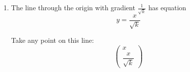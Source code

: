 \documentclass[leqno]{article}
\begin{document}
\begin{enumerate}[
  label=\textbf{\arabic*.},
  leftmargin=*,
  topsep=0pt,
  partopsep=0pt,
  parsep=0pt
]
\begin{djsSolution}
\begin{enumerate}[label=\textbf{(\alph*)}]
  The area scale factor of a transformation is $|\det(\mathbf{M})|$, so
  \[
  \det(\mathbf{M})
  =
  \begin{vmatrix}
  0 & k\\
  1 & 0
  \end{vmatrix}
  =0-k=-k
  \]

  Hence the area scale factor is
  \[
  |\det(\mathbf{M})|=k
  \]

  Since the unit square has area $1$, the area of rectangle $OABC$ is
  \[
  1\times k=k
  \]

  To transform $OABC$ back to the unit square, we need $\mathbf{M}^{-1}$.
  For
  \[
  \mathbf{M}=
  \begin{pmatrix}
  0 & k\\
  1 & 0
  \end{pmatrix}
  \]
  \[
  \mathbf{M}^{-1}
  =
  -\frac{1}{k}
  \begin{pmatrix}
  0 & -k\\
  -1 & 0
  \end{pmatrix}
  =
  \begin{pmatrix}
  0 & 1\\
  \frac{1}{k} & 0
  \end{pmatrix}
  \]

  Therefore the area of $OABC$ is $k$, and the required matrix is
  \[
  \begin{pmatrix}
  0 & 1\\
  \frac{1}{k} & 0
  \end{pmatrix}
  \]

  \item The line through the origin with gradient $\frac{1}{\sqrt{k}}$ has equation
  \[
  y=\frac{x}{\sqrt{k}}
  \]

  Take any point on this line:
  \[
  \begin{pmatrix}
  x\\[2pt]
  \dfrac{x}{\sqrt{k}}
  \end{pmatrix}
  \]


\end{enumerate}
\end{djsSolution}
\end{enumerate}
\end{document}
